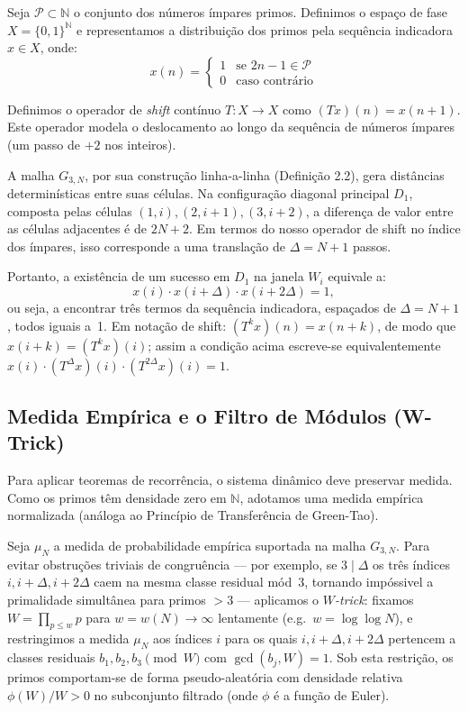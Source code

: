 \documentclass[12pt,a4paper]{article}
\theoremstyle{remark}
\begin{document}
	Seja $\mathcal{P} \subset \mathbb{N}$ o conjunto dos números ímpares primos. Definimos o espaço de fase $X = \{0,1\}^{\mathbb{N}}$ e representamos a distribuição dos primos pela sequência indicadora $x \in X$, onde:
	\begin{equation}
		x(n) = \begin{cases} 
			1 & \text{se } 2n-1 \in \mathcal{P} \\
			0 & \text{caso contrário}
		\end{cases}
	\end{equation}
	
	Definimos o operador de \textit{shift} contínuo $T: X \to X$ como $(Tx)(n) = x(n+1)$. Este operador modela o deslocamento ao longo da sequência de números ímpares (um passo de $+2$ nos inteiros).
	
	A malha $G_{3,N}$, por sua construção linha-a-linha (Definição 2.2), gera distâncias determinísticas entre suas células. Na configuração diagonal principal $D_1$, composta pelas células $(1, i), (2, i+1), (3, i+2)$, a diferença de valor entre as células adjacentes é de $2N+2$. Em termos do nosso operador de shift no índice dos ímpares, isso corresponde a uma translação de $\Delta = N+1$ passos.
	
	Portanto, a exist\^encia de um sucesso em $D_1$ na janela $W_i$ equivale a:
	\begin{equation}
		x(i) \cdot x(i+\Delta) \cdot x(i+2\Delta) = 1,
	\end{equation}
	ou seja, a encontrar tr\^es termos da sequ\^encia indicadora, espa\c{c}ados de
	$\Delta = N+1$, todos iguais a~1.
	Em nota\c{c}\~ao de shift: $(T^k x)(n) = x(n+k)$, de modo que
	$x(i+k) = (T^k x)(i)$; assim a condi\c{c}\~ao acima escreve-se
	equivalentemente $x(i)\cdot(T^\Delta x)(i)\cdot(T^{2\Delta}x)(i)=1$.
	
	\subsection{Medida Empírica e o Filtro de Módulos (W-Trick)}
	
	Para aplicar teoremas de recorrência, o sistema dinâmico deve preservar medida. Como os primos têm densidade zero em $\mathbb{N}$, adotamos uma medida empírica normalizada (análoga ao Princípio de Transferência de Green-Tao). 
	
	Seja $\mu_N$ a medida de probabilidade emp\'irica suportada na malha $G_{3,N}$.
	Para evitar obstru\c{c}\~oes triviais de congru\^encia --- por exemplo,
	se $3 \mid \Delta$ os tr\^es \'indices $i, i+\Delta, i+2\Delta$ caem na mesma classe
	residual m\'od~$3$, tornando imp\'ossivel a primalidade simult\^anea para primos $>3$
	--- aplicamos o \emph{$W$-trick}: fixamos $W = \prod_{p \leq w} p$ para
	$w = w(N) \to \infty$ lentamente (e.g.\ $w = \log\log N$), e restringimos
	a medida $\mu_N$ aos \'indices $i$ para os quais $i, i+\Delta, i+2\Delta$
	pertencem a classes residuais $b_1, b_2, b_3 \pmod{W}$ com $\gcd(b_j, W)=1$.
	Sob esta restri\c{c}\~ao, os primos comportam-se de forma pseudo-aleat\'oria
	com densidade relativa $\phi(W)/W > 0$ no subconjunto filtrado
	(onde $\phi$ \'e a fun\c{c}\~ao de Euler).
	
\end{document}
